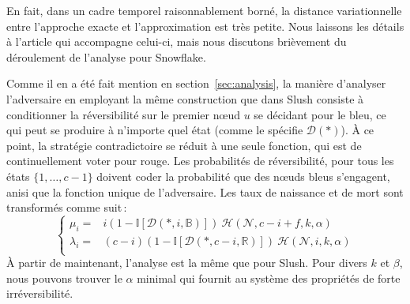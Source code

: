 \documentclass[letterpaper,twocolumn,10pt]{article}
\theoremstyle{definition}
\begin{document}
\begin{appendices}
En fait, dans un cadre temporel raisonnablement borné, la distance variationnelle entre l'approche exacte et l'approximation est très petite.
Nous laissons les détails à l'article qui accompagne celui-ci, mais nous discutons brièvement du déroulement de l'analyse pour Snowflake.


Comme il en a été fait mention en section~\ref{sec:analysis}, la manière d'analyser l'adversaire en employant la même construction que dans Slush consiste à conditionner la réversibilité sur le premier nœud $u$ se décidant pour le bleu, ce qui peut se produire à n'importe quel état (comme le spécifie $\mathcal{D}(*)$). À ce point, la stratégie contradictoire se réduit à une seule fonction, qui est de continuellement voter pour rouge. Les probabilités de réversibilité, pour tous les états $\{1, \dots, c-1\}$ doivent coder la probabilité que des nœuds bleus s'engagent, anisi que la fonction unique de l'adversaire. Les taux de naissance et de mort sont transformés comme suit\,:
\[
    \begin{cases}
        \mu_i = &i(1 - \mathbb{I}[\mathcal{D}(*, i, \mathbb{B})])\ \mathcal{H}(\mathcal{N}, c-i + f, k, \alpha)\\
        \lambda_i = &(c-i)(1 - \mathbb{I}[\mathcal{D}(*, c-i, \mathbb{R})])\ \mathcal{H}(\mathcal{N}, i, k, \alpha)\\
    \end{cases}
\]
À partir de maintenant, l'analyse est la même que pour Slush. Pour divers $k$ et $\beta$, nous pouvons trouver le $\alpha$ minimal qui fournit au système des propriétés de forte irréversibilité.


\end{appendices}
\end{document}
